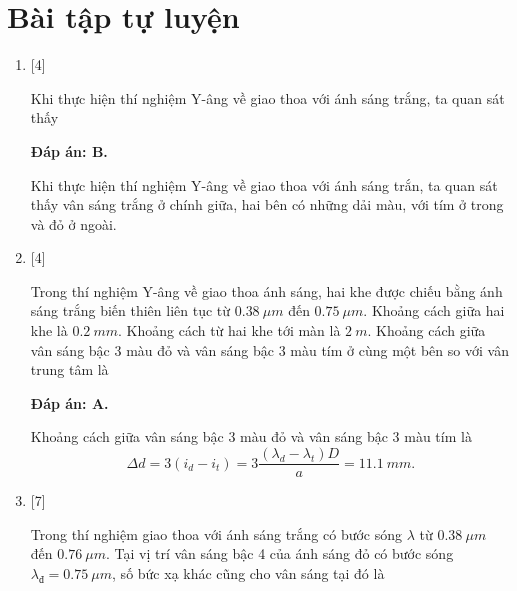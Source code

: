 \section{Bài tập tự luyện}
\begin{enumerate}[label=\bfseries Câu \arabic*:]
	
	\item {} [4]
	\cauhoi
	{Khi thực hiện thí nghiệm Y-âng về giao thoa với ánh sáng trắng, ta quan sát thấy
	}
	
	\loigiai
	{		\textbf{Đáp án: B.}
		
		Khi thực hiện thí nghiệm Y-âng về giao thoa với ánh sáng trắn, ta quan sát thấy vân sáng trắng ở chính giữa, hai bên có những dải màu, với tím ở trong và đỏ ở ngoài.
	}
	
	\item {} [4]
	\cauhoi
	{Trong thí nghiệm Y-âng về giao thoa ánh sáng, hai khe được chiếu bằng ánh sáng trắng biến thiên liên tục từ $\SI{0,38}{\mu m}$ đến $\SI{0,75}{\mu m}$. Khoảng cách giữa hai khe là $\SI{0,2}{mm}$. Khoảng cách từ hai khe tới màn là $\SI{2}{m}$. Khoảng cách giữa vân sáng bậc 3 màu đỏ và vân sáng bậc 3 màu tím ở cùng một bên so với vân trung tâm là
	}
	
	\loigiai
	{		\textbf{Đáp án: A.}
		
		Khoảng cách giữa vân sáng bậc 3 màu đỏ và vân sáng bậc 3 màu tím là
		$$
		\Delta d = 3(i_{d} - i_{t}) = 3\dfrac{(\lambda_{d} - \lambda_{t})D}{a} = \SI{11,1}{mm}.
		$$
	}
	
	\item {} [7]
	\cauhoi
	{Trong thí nghiệm giao thoa với ánh sáng trắng có bước sóng $\lambda$ từ $\SI{0,38}{\mu m}$ đến $\SI{0,76}{\mu m}$. Tại vị trí vân sáng bậc 4 của ánh sáng đỏ có bước sóng $\lambda_{\text{đ}} =\SI{0,75}{\mu m}$, số bức xạ khác cũng cho vân sáng tại đó là
	}
	

\end{enumerate}
